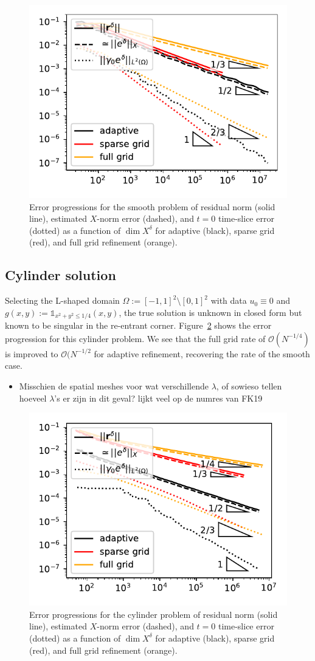 \documentclass[11pt,a4paper,oneside,english]{amsart}
\numberwithin{equation}{section}
\numberwithin{theorem}{section}
\theoremstyle{definition}
\newcommand{\jw}[1]{{\color{red}{JW: #1}}}
\newcommand{\bbone}{\mathds{1}}
\begin{document}
\begin{figure}
  \includegraphics[width=0.5\linewidth]{smooth_adaptive_errors}
  \caption{Error progressions for the smooth problem of residual norm (solid line),
  estimated $X$-norm error (dashed), and $t=0$ time-slice error (dotted) as a function
  of $\dim X^\delta$ for adaptive (black), sparse grid (red), and full grid refinement (orange).}
  \label{fig:smooth}
\end{figure}

\subsection{Cylinder solution}
Selecting the L-shaped domain $\Omega := [-1,1]^2 \setminus [0,1]^2$ with data
$u_0 \equiv 0$ and $g(x,y) := \bbone_{{x^2 + y^2 \leq 1/4}}(x,y)$, the true
solution is unknown in closed form but known to be singular in the re-entrant
corner.\jw{is het wel singulier? of alleen minder regulier? hier wil ik een citatie of *iets* anders}
Figure~\ref{fig:cylinder} shows the error progression for this cylinder problem.
We see that the full grid rate of $\mathcal O(N^{-1/4})$ is improved to $\mathcal O(N^{-1/2}$
for adaptive refinement, recovering the rate of the smooth case.

\begin{itemize}
  \item Misschien de spatial meshes voor wat verschillende $\lambda$, of sowieso
    tellen hoeveel $\lambda$'s er zijn in dit geval? lijkt veel op de numres van FK19
\end{itemize}
\begin{figure}
  \includegraphics[width=0.5\linewidth]{cylinder_adaptive_errors}
  \caption{Error progressions for the cylinder problem of residual norm (solid line),
  estimated $X$-norm error (dashed), and $t=0$ time-slice error (dotted) as a function
  of $\dim X^\delta$ for adaptive (black), sparse grid (red), and full grid refinement (orange).}
  \label{fig:cylinder}
\end{figure}
\end{document}
